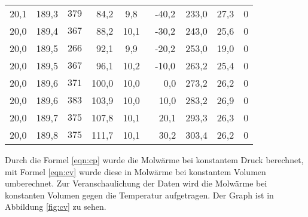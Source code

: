 \begin{table}
\begin{tabular}{S[table-format=2.1] S S S[table-format=2.1] S S S S S}
          {20,1 } & {189,3}  & {$379$} & {~84,2} &  9,8 & {~-40,2} & 233,0 & {27,3} & 0 \\
          {20,0 } & {189,4}  & {$367$} & {~88,2} & 10,1 & {~-30,2} & 243,0 & {25,6} & 0 \\
          {20,0 } & {189,5}  & {$266$} & {~92,1} &  9,9 & {~-20,2} & 253,0 & {19,0} & 0 \\
          {20,0 } & {189,5}  & {$367$} & {~96,1} & 10,2 & {~-10,0} & 263,2 & {25,4} & 0 \\
          {20,0 } & {189,6}  & {$371$} & {100,0} & 10,0 & {~~~0,0} & 273,2 & {26,2} & 0 \\
          {20,0 } & {189,6}  & {$383$} & {103,9} & 10,0 & {~~10,0} & 283,2 & {26,9} & 0 \\
          {20,0 } & {189,7}  & {$375$} & {107,8} & 10,1 & {~~20,1} & 293,3 & {26,3} & 0 \\
          {20,0 } & {189,8}  & {$375$} & {111,7} & 10,1 & {~~30,2} & 303,4 & {26,2} & 0 \\
      \bottomrule
    \end{tabular}
\end{table}

Durch die Formel \ref{eqn:cp} wurde die Molwärme bei konstantem Druck berechnet, mit Formel \ref{eqn:cv} 
wurde diese in Molwärme bei konstantem Volumen umberechnet. Zur Veranschaulichung der Daten wird 
die Molwärme bei konstanten Volumen gegen die Temperatur aufgetragen. Der Graph ist in Abbildung \ref{fig:cv}
zu sehen. 


  
  
  
  
  
 
  
  
  
  
  
 
  
  
  
  
  
 
  
  
  
  

 
 
 
 
 
  
 
 
 
 
 

 
 
  
  
  
 
 
 
 

 
  
  
 
  
  
  
 
  
  
 
 
  
  
  
 
  
 
 
 
 
 